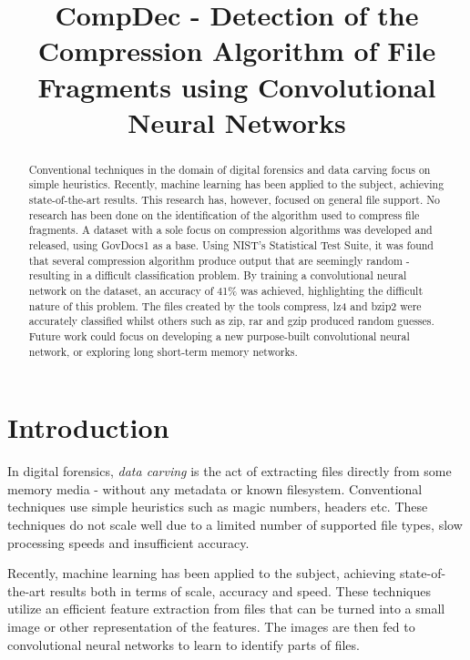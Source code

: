 \documentclass[conference]{IEEEtran}
\begin{document}
\title{CompDec - Detection of the Compression Algorithm of File Fragments using Convolutional Neural Networks}

\author{
}

\maketitle

\begin{abstract}
    Conventional techniques in the domain of digital forensics and data carving focus on simple heuristics. Recently, machine learning has been applied to the subject, achieving state-of-the-art results. This research has, however, focused on general file support. No research has been done on the identification of the algorithm used to compress file fragments. A dataset with a sole focus on compression algorithms was developed and released, using GovDocs1 as a base. Using NIST's Statistical Test Suite, it was found that several compression algorithm produce output that are seemingly random - resulting in a difficult classification problem. By training a convolutional neural network on the dataset, an accuracy of 41\% was achieved, highlighting the difficult nature of this problem. The files created by the tools compress, lz4 and bzip2 were accurately classified whilst others such as zip, rar and gzip produced random guesses. Future work could focus on developing a new purpose-built convolutional neural network, or exploring long short-term memory networks.
\end{abstract}

\section{Introduction}

In digital forensics, \textit{data carving} is the act of extracting files directly from some memory media - without any metadata or known filesystem. Conventional techniques use simple heuristics such as magic numbers, headers etc. These techniques do not scale well due to a limited number of supported file types, slow processing speeds and insufficient accuracy.

Recently, machine learning has been applied to the subject, achieving state-of-the-art results both in terms of scale, accuracy and speed. These techniques utilize an efficient feature extraction from files that can be turned into a small image or other representation of the features. The images are then fed to convolutional neural networks to learn to identify parts of files.
\end{document}
